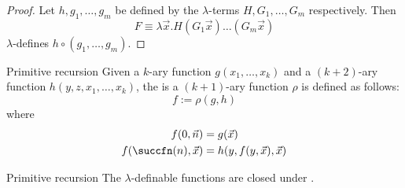 \documentclass[a4paper, 12pt]{report}
\begin{document}
    \begin{proof}
        Let $h, g_1, \ldots, g_m$ be defined by the $\lambda$-terms $H, G_1, \ldots, G_m$ respectively. Then $$F \equiv \lambda \vec x. H(G_1\vec x) \ldots (G_m \vec x)$$ $\lambda$-defines $h \circ (g_1, \ldots, g_m)$.
    \end{proof}
    
    \begin{frameddefn}{Primitive recursion}
        Given a $k$-ary function $g(x_1, \ldots, x_k)$ and a $(k + 2)$-ary function $h(y, z, x_1, \ldots, x_k)$, the  is a $(k + 1)$-ary function $\rho$ is defined as follows: $$f := \rho (g, h)$$ where
        \begin{equation*}
            \begin{split}
                f(0, \vec n) &= g(\vec x) \\
                f(\succfn(n), \vec x) &= h(y, f(y, \vec x), \vec x)
            \end{split}
        \end{equation*}
    \end{frameddefn}
    
    \begin{framedlem}[label={lem:prim_rec}]{Primitive recursion}
        The $\lambda$-definable functions are closed under .
    \end{framedlem}
\end{document}
